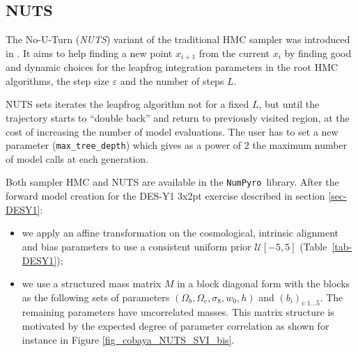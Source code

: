 \documentclass[twocolumn,twocolappendix,nofootinbib,iop]{openjournal}
\newcommand{\numpyro}{\texttt{NumPyro}}
\begin{document}
\subsection{NUTS}
\label{sec-NUTS}
%

The No-U-Turn (\textit{NUTS})  variant of the traditional HMC sampler was introduced in \citet{10.5555/2627435.2638586}. It aims to help finding a new point  $x_{i+1}$ from  the current $x_i$ by finding good and dynamic choices for the leapfrog integration parameters in the root HMC algorithms, the step size $\varepsilon$ and the number of steps $L$.

NUTS sets iterates the leapfrog algorithm not for a fixed $L$, but until the trajectory starts to ``double back'' and return to previously visited region, at the cost of increasing the number of model evaluations. The user has to set a new  parameter  (\texttt{max\_tree\_depth}) which gives as a power of $2$ the maximum number of model calls at each generation.

Both sampler HMC and NUTS are available in the \numpyro\ library. After the forward model creation for the DES-Y1 3x2pt exercise described in section \ref{sec-DESY1}: \begin{itemize}
    \item we apply an affine transformation on the cosmological, intrinsic alignment and bias parameters to use a consistent uniform prior $\mathcal{U}[-5,5]$ (Table~\ref{tab-DESY1});
    \item
    we use a structured mass matrix $M$ in a block diagonal form with the blocks as the following sets of parameters $(\Omega_b,\Omega_c,\sigma_8,w_0,h)$ and $(b_i)_{i:1\dots5}$. The remaining parameters have uncorrelated masses. This matrix structure is motivated by the expected degree of parameter correlation as shown for instance in Figure \ref{fig_cobaya_NUTS_SVI_bis}.
\end{itemize}

\end{document}
